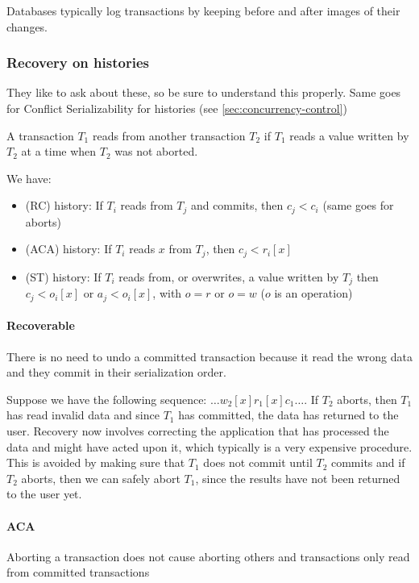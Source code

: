 Databases typically log transactions by keeping before and after images of their changes.


\subsubsection{Recovery on histories}
\label{sec:recovery-of-histories}
\begin{examdetails}
    They like to ask about these, so be sure to understand this properly. Same goes for Conflict Serializability for histories (see \ref{sec:concurrency-control})
\end{examdetails}
A transaction $T_1$ reads from another transaction $T_2$ if $T_1$ reads a value written by $T_2$ at a time when $T_2$ was not aborted.

We have:
\begin{itemize}
    \item {} (RC) history: If $T_i$ reads from $T_j$ and commits, then $c_j < c_i$ (same goes for aborts)
    \item {} (ACA) history: If $T_i$ reads $x$ from $T_j$, then $c_j < r_i[x]$
    \item {} (ST) history: If $T_i$ reads from, or overwrites, a value written by $T_j$ then $c_j < o_i[x]$ or $a_j < o_i[x]$, with $o = r$ or $o = w$ ($o$ is an operation)
\end{itemize}


\paragraph{Recoverable}
There is no need to undo a committed transaction because it read the wrong data and they commit in their serialization order.

Suppose we have the following sequence: $\ldots w_2[x] r_1[x] c_1 \ldots$.
If $T_2$ aborts, then $T_1$ has read invalid data and since $T_1$ has committed, the data has returned to the user.
Recovery now involves correcting the application that has processed the data and might have acted upon it, which typically is a very expensive procedure.
This is avoided by making sure that $T_1$ does not commit until $T_2$ commits and if $T_2$ aborts, then we can safely abort $T_1$,
since the results have not been returned to the user yet.


\paragraph{ACA}
Aborting a transaction does not cause aborting others and transactions only read from committed transactions

